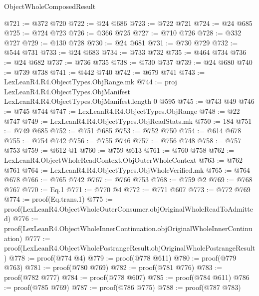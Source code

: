\begin{lexlean}{ObjectWholeComposedResult}
\begin{coremodule}
@721 := @372 @720
@722 := @24 @686
@723 := @722 @721
@724 := @24 @685
@725 := @724 @723
@726 := @366 @725
@727 := @710 @726
@728 := @332 @727
@729 := @130 @728
@730 := @24 @681
@731 := @730 @729
@732 := @544 @731
@733 := @24 @683
@734 := @733 @732
@735 := @464 @734
@736 := @24 @682
@737 := @736 @735
@738 := @730 @737
@739 := @24 @680
@740 := @739 @738
@741 := @442 @740
@742 := @679 @741
@743 := LexLeanR4.R4.ObjectTypes.ObjRange.mk
@744 := proj LexLeanR4.R4.ObjectTypes.ObjManifest LexLeanR4.R4.ObjectTypes.ObjManifest.length 0 @595
@745 := @743 @49
@746 := @745 @744
@747 := LexLeanR4.R4.ObjectTypes.ObjRange
@748 := @22 @747
@749 := LexLeanR4.R4.ObjectTypes.ObjReadStats.mk
@750 := 184
@751 := @749 @685
@752 := @751 @685
@753 := @752 @750
@754 := @614 @678
@755 := @754 @742
@756 := @755 @746
@757 := @756 @748
@758 := @757 @753
@759 := @612 @1
@760 := @759 @613
@761 := @760 @758
@762 := LexLeanR4.ObjectWholeReadContext.ObjOuterWholeContext
@763 := @762 @761
@764 := LexLeanR4.R4.ObjectTypes.ObjWholeVerified.mk
@765 := @764 @678
@766 := @765 @742
@767 := @766 @753
@768 := @759 @2
@769 := @768 @767
@770 := Eq.{1}
@771 := @770 @4
@772 := @771 @607
@773 := @772 @769
@774 := proof(Eq.trans.{1})
@775 := proof(LexLeanR4.ObjectWholeOuterConsumer.objOriginalWholeReadToAdmitted)
@776 := proof(LexLeanR4.ObjectWholeInnerContinuation.objOriginalWholeInnerContinuation)
@777 := proof(LexLeanR4.ObjectWholePostrangeResult.objOriginalWholePostrangeResult)
@778 := proof(@774 @4)
@779 := proof(@778 @611)
@780 := proof(@779 @763)
@781 := proof(@780 @769)
@782 := proof(@781 @776)
@783 := proof(@782 @777)
@784 := proof(@778 @607)
@785 := proof(@784 @611)
@786 := proof(@785 @769)
@787 := proof(@786 @775)
@788 := proof(@787 @783)
\end{coremodule}
\end{lexlean}
